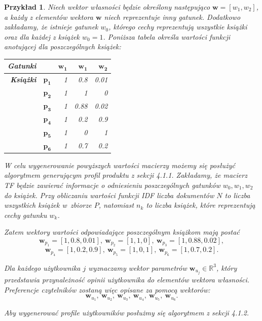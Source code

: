 \documentclass[12pt,a4paper]{report}
\newtheorem{przyklad}{Przykład}[chapter]{\normalfont}
\newcommand{\setR}{\mathbb{R}}
\newcommand{\setPrzedmioty}{\mathit{P}}
\begin{document}
\begin{przyklad}
Niech wektor własności będzie określony następująco $\mathbf{w} = [w_1, w_2]$, a każdy z elementów wektora $\mathbf{w}$ niech reprezentuje inny gatunek. Dodatkowo zakładamy, że istnieje gatunek $w_0$, którego cechy reprezentują wszystkie książki oraz dla każdej z książek $w_0=1$. Poniższa tabela określa wartości funkcji anotującej dla poszczególnych książek:
\begin{center}
\begin{tabular}{|r|r|r|r|r|} \hline
\textbf{Gatunki} & & $\mathbf{w_1}$ &  $\mathbf{w_1}$ & $\mathbf{w_2}$  \\
\hline
\hline
\textbf{Książki} &$\mathbf{p_1}$ & 1 & 0.8 & 0.01 \\
\hline
&$\mathbf{p_2}$ & 1 & 1 & 0  \\
\hline
&$\mathbf{p_3}$ & 1 & 0.88 & 0.02 \\
\hline
&$\mathbf{p_4}$ & 1 & 0.2 & 0.9 \\
\hline
&$\mathbf{p_5}$ & 1 & 0 & 1 \\
\hline
&$\mathbf{p_6}$ & 1 & 0.7 & 0.2 \\
\hline
\end{tabular}
\end{center}

W celu wygenerowanie powyższych wartości macierzy możemy się posłużyć algorytmem generującym profil produktu z sekcji 4.1.1. Zakładamy, że macierz TF będzie zawierać informacje o odniesieniu poszczególnych gatunków $w_0, w_1,w_2$ do książek. Przy obliczaniu wartości funkcji IDF liczba dokumentów $N$ to liczba wszystkich książek w~zbiorze $\setPrzedmioty$, natomiast $n_k$ to liczba książek, które reprezentują cechy gatunku $w_k$.

Zatem wektory wartości odpowiadające poszczególnym książkom mają postać
$$
\mathbf{w}_{p_1} = [1, 0.8, 0.01], \: \mathbf{w}_{p_2} = [1, 1, 0], \: \mathbf{w}_{p_3} = [1, 0.88, 0.02],
$$
$$
\mathbf{w}_{p_4} = [1, 0.2, 0.9], \: \mathbf{w}_{p_5} = [1, 0, 1], \: \mathbf{w}_{p_6} = [1, 0.7, 0.2].
$$
\bigskip
\bigskip
\bigskip
\bigskip

Dla każdego użytkownika $j$ wyznaczamy wektor parametrów $\mathbf{w}_{u_j} \in \setR^3$, który przedstawia przynależność opinii użytkownika do elementów wektora własności. Preferencje czytelników zostaną więc opisane za pomocą wektorów:
$$
\mathbf{w}_{u_1}, \: \mathbf{w}_{u_2}, \: \mathbf{w}_{u_3}, \: \mathbf{w}_{u_4}, \: \mathbf{w}_{u_5}, \: \mathbf{w}_{u_6}.
$$
\bigskip

Aby wygenerować profile użytkowników posłużmy się algorytmem z sekcji 4.1.2.


\end{przyklad}
\end{document}
